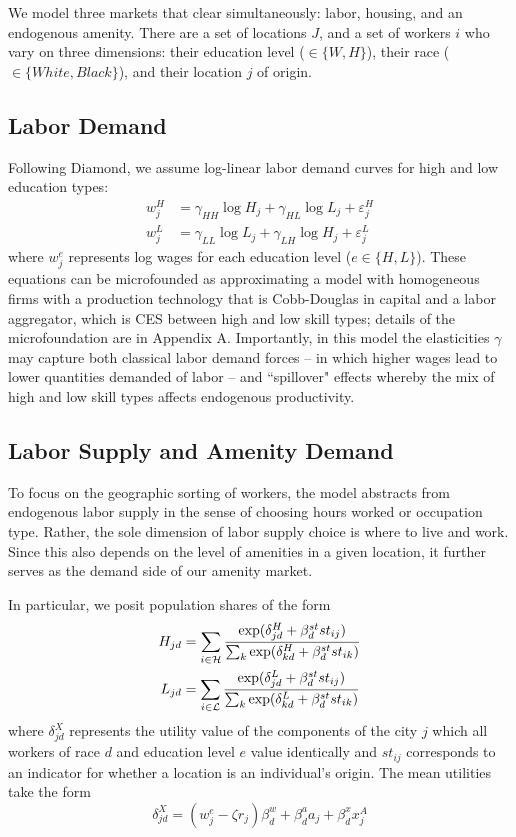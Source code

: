 \documentclass{article}
\begin{document}
We model three markets that clear simultaneously: labor, housing, and an endogenous amenity. There are a set of locations $J$, and a set of workers $i$ who vary on three dimensions: their education level ($\in \{W,H\}$), their race ($\in \{White,Black\}$), and their  location $j$ of origin. 


\subsection{Labor Demand}

Following Diamond, we assume log-linear labor demand curves for high and low education types: 
\begin{align}
    w_{j}^H &= \gamma_{HH}\log H_{j} + \gamma_{HL} \log L_{j} + \varepsilon_{j}^H \label{eq_wage_h_aprx} 
    \\ 
    w_{j}^L &= \gamma_{LL}\log L_{j} + \gamma_{LH} \log H_{j} + \varepsilon_{j}^L \label{eq_wage_l_aprx} 
\end{align}
 where $w_j^e$ represents log wages for each education level ($e\in \{H, L\}$). These equations can be microfounded as approximating a model with homogeneous firms with a  production technology that is Cobb-Douglas in capital and a labor aggregator, which is CES between high and low skill types; details of the microfoundation are in Appendix A. Importantly, in this model the elasticities $\gamma$ may capture both classical labor demand forces  -- in which higher wages lead to lower quantities demanded of labor -- and ``spillover" effects whereby the mix of high and low skill types affects endogenous productivity. 

\subsection{Labor Supply and Amenity Demand }


To focus on the geographic sorting of workers, the model abstracts from endogenous labor supply in the sense of choosing hours worked or occupation type. Rather, the sole dimension of labor supply choice is where to live and work. Since this also depends on the level of amenities in a given location, it further serves as the demand side of our amenity market.

In particular, we posit population shares of the form 
\begin{align}
H_{jd} &= \sum_{i\in\mathcal{H}} \frac{\exp(\delta_{jd}^H + \beta_d^{st}st_{ij})}{\sum_{k} \exp(\delta_{kd}^H + \beta_d^{st}st_{ik})} \label{eq:H_share} \\
L_{jd} &= \sum_{i\in\mathcal{L}} \frac{\exp(\delta_{jd}^L + \beta_d^{st}st_{ij})}{\sum_{k} \exp(\delta_{kd}^L + \beta_d^{st}st_{ik})}\label{eq:L_share}
\end{align}
where $\delta_{jd}^X$ represents the utility value of the components of the city $j$ which all workers of race $d$ and education level $e$ value identically and $st_{ij}$ corresponds to an indicator for whether a location is an individual's origin. The mean utilities take the form 
\begin{equation}\label{eq:delta_X} \delta_{jd}^X = (w_{j}^e - \zeta r_{j})\beta_d^w + \beta^a_d a_{j} + \beta^x_d x_{j}^A \end{equation}
\end{document}
